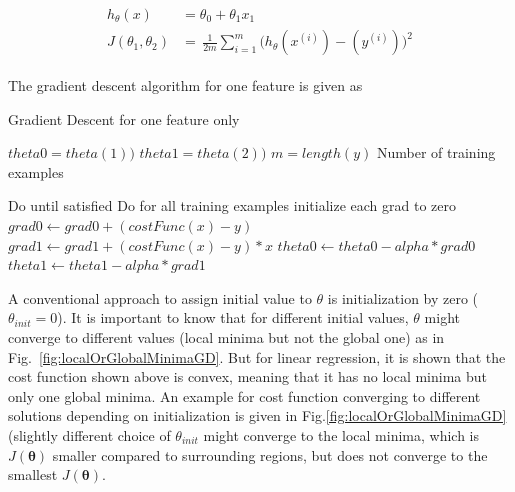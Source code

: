 \begin{align}
\label{eqn:linearRegressionTwoFeaturesSummary}
\begin{split}
h_{\theta}(x) & = \theta_0 + \theta_1 x_1 
\\
J(\theta_1,\theta_2)
 & =\,
\frac{1}{2m} \sum\limits_{i=1}^{m} \Big(h_\theta(x^{(i)}) - (y^{(i)})\Big)^2  
\end{split}
\end{align}

\clearpage

The gradient descent algorithm for one feature is given as 

 \begin{algorithm}
   \caption{Gradient Descent for one feature only}
    \begin{algorithmic}[1]
      

        \State $theta0 = theta(1))$  
        \State $theta1 = theta(2))$  
        \State $m = length(y)$ \Comment Number of training examples

         \Comment Do until satisfied
                     \Comment Do for all training examples
                         \State initialize each grad to zero
           	 	\State $grad0 \leftarrow grad0 + (costFunc(x) - y)$
		         \State $grad1 \leftarrow grad1 + (costFunc(x) - y) * x$
                    \EndFor
                    \State $theta0 \leftarrow theta0 - alpha * grad0$
                    \State $theta1 \leftarrow theta1 - alpha * grad1$
        \EndFor
       \EndFunction

\end{algorithmic}
\end{algorithm}
 
A conventional approach to assign initial value to $\theta$ is initialization by zero ($\theta_{init} = 0$).
It is important to know that for different initial values, $\theta$ might converge to different values (local minima but not the global one) as in Fig.~\ref{fig:localOrGlobalMinimaGD}. 
But for linear regression, it is shown that the cost function shown above is convex, meaning that it has no local minima but only one global minima. An example for cost function converging to different solutions depending on initialization is given in Fig.\ref{fig:localOrGlobalMinimaGD} (slightly different choice of $\theta_{init}$ might converge to the local minima, which is $J(\bm{\theta})$ smaller compared to surrounding regions, but does not converge to the smallest $J(\bm{\theta})$.

